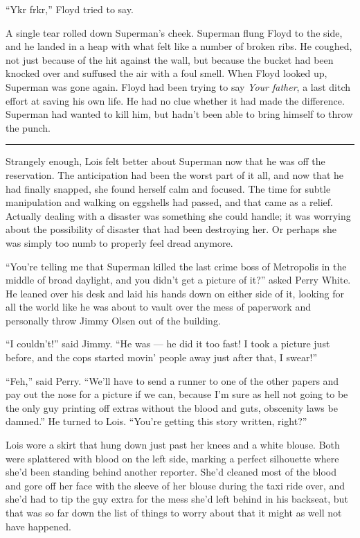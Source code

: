 ``Ykr frkr,'' Floyd tried to say.

A single tear rolled down Superman's cheek. Superman flung Floyd to the
side, and he landed in a heap with what felt like a number of broken
ribs. He coughed, not just because of the hit against the wall, but
because the bucket had been knocked over and suffused the air with a
foul smell. When Floyd looked up, Superman was gone again. Floyd had
been trying to say \emph{Your father}, a last ditch effort at saving his
own life. He had no clue whether it had made the difference. Superman
had wanted to kill him, but hadn't been able to bring himself to throw
the punch.

\begin{center}\rule{0.5\linewidth}{0.5pt}\end{center}

Strangely enough, Lois felt better about Superman now that he was off
the reservation. The anticipation had been the worst part of it all, and
now that he had finally snapped, she found herself calm and focused. The
time for subtle manipulation and walking on eggshells had passed, and
that came as a relief. Actually dealing with a disaster was something
she could handle; it was worrying about the possibility of disaster that
had been destroying her. Or perhaps she was simply too numb to properly
feel dread anymore.

``You're telling me that Superman killed the last crime boss of
Metropolis in the middle of broad daylight, and you didn't get a picture
of it?'' asked Perry White. He leaned over his desk and laid his hands
down on either side of it, looking for all the world like he was about
to vault over the mess of paperwork and personally throw Jimmy Olsen out
of the building.

``I couldn't!'' said Jimmy. ``He was --- he did it too fast! I took a
picture just before, and the cops started movin' people away just after
that, I swear!''

``Feh,'' said Perry. ``We'll have to send a runner to one of the other
papers and pay out the nose for a picture if we can, because I'm sure as
hell not going to be the only guy printing off extras without the blood
and guts, obscenity laws be damned.'' He turned to Lois. ``You're
getting this story written, right?''

Lois wore a skirt that hung down just past her knees and a white blouse.
Both were splattered with blood on the left side, marking a perfect
silhouette where she'd been standing behind another reporter. She'd
cleaned most of the blood and gore off her face with the sleeve of her
blouse during the taxi ride over, and she'd had to tip the guy extra for
the mess she'd left behind in his backseat, but that was so far down the
list of things to worry about that it might as well not have happened.

